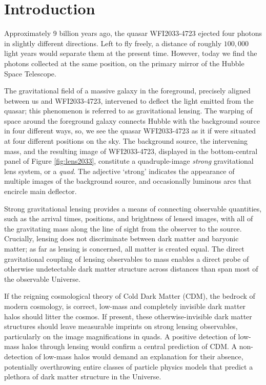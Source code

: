 
%
%

\chapter{Introduction}

\indent Approximately 9 billion years ago, the quasar WFI2033-4723 ejected four photons in slightly different directions. Left to fly freely, a distance of roughly $100,000$ light years would separate them at the present time. However, today we find the photons collected at the same position, on the primary mirror of the Hubble Space Telescope. 

The gravitational field of a massive galaxy in the foreground, precisely aligned between us and WFI2033-4723, intervened to deflect the light emitted from the quasar; this phenomenon is referred to as gravitational lensing. The warping of space around the foreground galaxy connects Hubble with the background source in four different ways, so, we see the quasar WFI2033-4723 as it if were situated at four different positions on the sky. The background source, the intervening mass, and the resulting image of WFI2033-4723, displayed in the bottom-central panel of Figure \ref{fig:lens2033}, constitute a quadruple-image \textit{strong} gravitational lens system, or a \textit{quad}. The adjective `strong' indicates the appearance of multiple images of the background source, and occasionally luminous arcs that encircle main deflector. 

Strong gravitational lensing provides a means of connecting observable quantities, such as the arrival times, positions, and brightness of lensed images, with all of the gravitating mass along the line of sight from the observer to the source. Crucially, lensing does not discriminate between dark matter and baryonic matter; as far as lensing is concerned, all matter is created equal. The direct gravitational coupling of lensing observables to mass enables a direct probe of otherwise undetectable dark matter structure across distances than span most of the observable Universe.    

If the reigning cosmological theory of Cold Dark Matter (CDM), the bedrock of modern cosmology, is correct, low-mass and completely invisible dark matter halos should litter the cosmos. If present, these otherwise-invisible dark matter structures should leave measurable imprints on strong lensing observables, particularly on the image magnifications in quads. A positive detection of low-mass halos through lensing would confirm a central prediction of CDM. A non-detection of low-mass halos would demand an explanation for their absence, potentially overthrowing entire classes of particle physics models that predict a plethora of dark matter structure in the Universe. 

